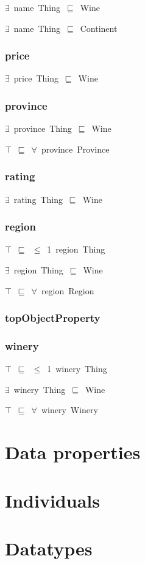 \documentclass{article}
\begin{document}
\ensuremath{\exists}~name~Thing~\ensuremath{\sqsubseteq}~Wine

\ensuremath{\exists}~name~Thing~\ensuremath{\sqsubseteq}~Continent

\subsubsection*{price}

\ensuremath{\exists}~price~Thing~\ensuremath{\sqsubseteq}~Wine

\subsubsection*{province}

\ensuremath{\exists}~province~Thing~\ensuremath{\sqsubseteq}~Wine

\ensuremath{\top}~\ensuremath{\sqsubseteq}~\ensuremath{\forall}~province~Province

\subsubsection*{rating}

\ensuremath{\exists}~rating~Thing~\ensuremath{\sqsubseteq}~Wine

\subsubsection*{region}

\ensuremath{\top}~\ensuremath{\sqsubseteq}~\ensuremath{\leq}~1~region~Thing

\ensuremath{\exists}~region~Thing~\ensuremath{\sqsubseteq}~Wine

\ensuremath{\top}~\ensuremath{\sqsubseteq}~\ensuremath{\forall}~region~Region

\subsubsection*{topObjectProperty}

\subsubsection*{winery}

\ensuremath{\top}~\ensuremath{\sqsubseteq}~\ensuremath{\leq}~1~winery~Thing

\ensuremath{\exists}~winery~Thing~\ensuremath{\sqsubseteq}~Wine

\ensuremath{\top}~\ensuremath{\sqsubseteq}~\ensuremath{\forall}~winery~Winery

\section*{Data properties}\section*{Individuals}\section*{Datatypes}
\end{document}

